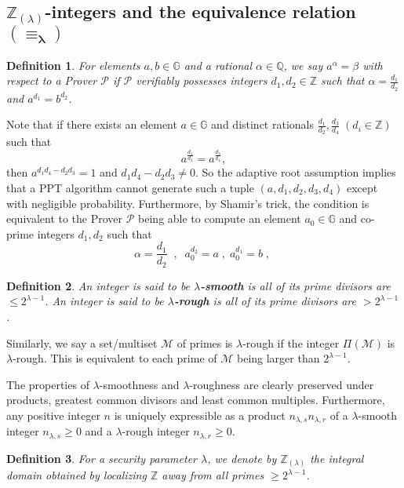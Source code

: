 \documentclass[11pt, lettersize, notitlepage, leqno, footskip=0.6cm]{article}
\newcommand{\bz}{\mathbb Z}
\newcommand{\bq}{\mathbb Q}
\newcommand{\mc}{\mathcal}
\newcommand{\mb}{\mathbb}
\newcommand{\al}{\alpha}
\newcommand{\be}{\beta}
\newcommand{\lam}{\lambda}
\newcommand{\lamb}{\lambda}
\newcommand{\mP}{\mc{P}}
\newcommand{\mcM}{\mc{M}}
\newcommand{\vs}{\vspace{-0.15cm}}
\newcommand{\noin}{\noindent}
\newtheorem{Def}{Definition}[section]
\numberwithin{equation}{section}
\begin{document}
\subsection{\fontsize{11}{11}\selectfont $\bz_{(\lamb)}$-integers and the equivalence relation $\mathbf{(\equiv_{\lam})}$}


\begin{Def} For elements $a, b\in\mb{G}$ and a rational $\al\in\bq$, we say $a^{\al} = \be$ with respect to a Prover $\mP$ if $\mP$ verifiably possesses integers $d_1,d_2\in\bz$ such that $\al = \frac{d_1}{d_2}$ and  $a^{d_1} = b^{d_2}$.\end{Def}

\noin Note that if there exists an element $a\in\mb{G}$ and distinct rationals $\frac{d_1}{d_2}, \frac{d_3}{d_4}\;(d_i\in\bz)$ such that \vs $$a^{\frac{d_1}{d_2}} = a^{\frac{d_3}{d_4}},$$ then $a^{d_1d_4-d_2d_3} = 1$ and $d_1d_4-d_2d_3\neq 0$. So the adaptive root assumption implies that a PPT algorithm cannot generate such a tuple $(a,d_1,d_2,d_3,d_4)$ except with negligible probability. Furthermore, by Shamir's trick, the condition is equivalent to the Prover $\mP$ being able to compute an element $a_0\in\mb{G}$ and co-prime integers $d_1,d_2$ such that \vs $$\al = \frac{d_1}{d_2}\;\;,\;\;a_0^{d_2} =a\;,\; a_0^{d_1} =b\;,\; $$


\begin{Def} An integer is said to be \textbf{$\lamb$-smooth} is all of its prime divisors are $\leq 2^{\lamb-1}$. An integer is said to be \textbf{$\lamb$-rough} is all of its prime divisors are $> 2^{\lam-1}$.\end{Def}

Similarly, we say a set/multiset $\mcM$ of primes is $\lam$-rough if the integer $\Pi(\mcM)$ is $\lam$-rough. This is equivalent to each prime of $\mcM$ being larger than $2^{\lam-1}$.

The properties of $\lamb$-smoothness and $\lamb$-roughness are clearly preserved under products, greatest common divisors and least common multiples. Furthermore, any positive integer $n$ is uniquely expressible as a product $n_{{\lam,s}}n_{{\lam,r}}$ of a $\lam$-smooth integer $n_{{\lam,s}}\geq 0$ and a $\lam$-rough integer $n_{{\lam,r}}\geq 0$.

\begin{Def} For a security parameter $\lamb$, we denote by $\bz_{(\lamb)}$ the integral domain obtained by localizing $\bz$ away from all primes $\geq 2^{\lamb-1}$. \end{Def}
\end{document}
